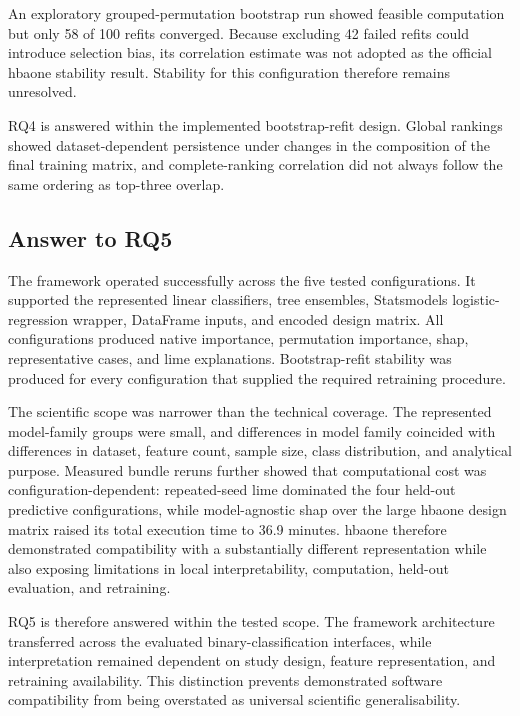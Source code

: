 An exploratory grouped-permutation bootstrap run showed feasible computation but only 58 of 100 refits converged. Because excluding 42 failed refits could introduce selection bias, its correlation estimate was not adopted as the official \gls{hbaone} stability result. Stability for this configuration therefore remains unresolved.

RQ4 is answered within the implemented bootstrap-refit design. Global rankings showed dataset-dependent persistence under changes in the composition of the final training matrix, and complete-ranking correlation did not always follow the same ordering as top-three overlap.

\subsection{Answer to RQ5}

The framework operated successfully across the five tested configurations. It supported the represented linear classifiers, tree ensembles, Statsmodels logistic-regression wrapper, DataFrame inputs, and encoded design matrix. All configurations produced native importance, permutation importance, \gls{shap}, representative cases, and \gls{lime} explanations. Bootstrap-refit stability was produced for every configuration that supplied the required retraining procedure.

The scientific scope was narrower than the technical coverage. The represented model-family groups were small, and differences in model family coincided with differences in dataset, feature count, sample size, class distribution, and analytical purpose. Measured bundle reruns further showed that computational cost was configuration-dependent: repeated-seed \gls{lime} dominated the four held-out predictive configurations, while model-agnostic \gls{shap} over the large \gls{hbaone} design matrix raised its total execution time to 36.9 minutes. \gls{hbaone} therefore demonstrated compatibility with a substantially different representation while also exposing limitations in local interpretability, computation, held-out evaluation, and retraining.

RQ5 is therefore answered within the tested scope. The framework architecture transferred across the evaluated binary-classification interfaces, while interpretation remained dependent on study design, feature representation, and retraining availability. This distinction prevents demonstrated software compatibility from being overstated as universal scientific generalisability.



